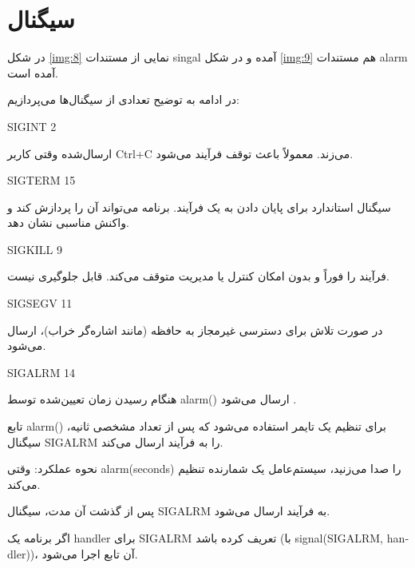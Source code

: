 \documentclass[12pt]{article}
\begin{document}
	\newpage
	\section{سیگنال}
	در شکل \ref{img:8} نمایی از مستندات singal آمده و در شکل \ref{img:9} هم مستندات alarm آمده است.
	
	در ادامه به توضیح تعدادی از سیگنال‌ها می‌پردازیم:
	
	\textenglish{SIGINT	2}
	
		ارسال‌شده وقتی کاربر Ctrl+C می‌زند. معمولاً باعث توقف فرآیند می‌شود.
		
	\textenglish{SIGTERM 15}
	
		سیگنال استاندارد برای پایان دادن به یک فرآیند. برنامه می‌تواند آن را پردازش کند و واکنش مناسبی نشان دهد.
		
	\textenglish{SIGKILL 9}
	
		فرآیند را فوراً و بدون امکان کنترل یا مدیریت متوقف می‌کند. قابل جلوگیری نیست.
		
	\textenglish{SIGSEGV 11}
		
			در صورت تلاش برای دسترسی غیرمجاز به حافظه (مانند اشاره‌گر خراب)، ارسال می‌شود.
			
	\textenglish{SIGALRM 14}
	
		هنگام رسیدن زمان تعیین‌شده توسط \textenglish{alarm()} ارسال می‌شود \cite{a2}.
		
		تابع alarm() برای تنظیم یک تایمر استفاده می‌شود که پس از تعداد مشخصی ثانیه، سیگنال SIGALRM را به فرآیند ارسال می‌کند.
		
		نحوه عملکرد:
		وقتی alarm(seconds) را صدا می‌زنید، سیستم‌عامل یک شمارنده تنظیم می‌کند.
		
		پس از گذشت آن مدت، سیگنال SIGALRM به فرآیند ارسال می‌شود.
		
		اگر برنامه یک handler برای SIGALRM تعریف کرده باشد (با \textenglish{signal(SIGALRM, handler)})، آن تابع اجرا می‌شود.
		
\end{document}
